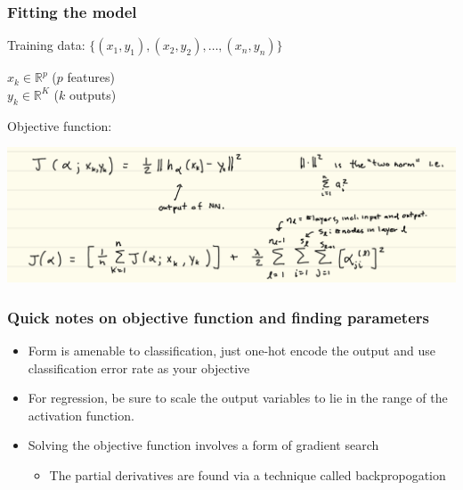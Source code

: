 \documentclass[mathserif, aspectratio=169]{beamer}
\begin{document}
\begin{frame}[t]\frametitle{Fitting the model}
	Training data: $\{(x_1,y_1), (x_2,y_2), \hdots, (x_n,y_n)\}$

	\vspace{5mm}

	$x_k \in \mathbb{R}^p$ ($p$ features)\\
	$y_k \in \mathbb{R}^K$ ($k$ outputs)

	Objective function: 
	\pause

	\includegraphics[height = 0.5\textheight]{NN_J}

\end{frame}

\begin{frame}[t]\frametitle{Quick notes on objective function and finding parameters}
    
	\begin{itemize}
	 	\item Form is amenable to classification, just one-hot encode the output and use classification error rate as your objective
	 	\item For regression, be sure to scale the output variables to lie in the range of the activation function. 
	 	\item Solving the objective function involves a form of gradient search
	 	\begin{itemize}
	 	 	\item The partial derivatives are found via a technique called backpropogation
	 	 \end{itemize} 
	\end{itemize} 

\end{frame}
\end{document}
